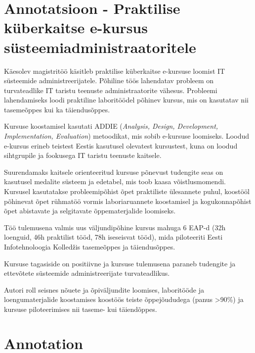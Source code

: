 \clearpage
\chapter*{Annotatsioon - Praktilise küberkaitse e-kursus
süsteemiadministraatoritele}
\label{annotatsioon}
\thispagestyle{empty}
Käesolev magistritöö käsitleb praktilise küberkaitse e-kursuse loomist IT süsteemide administreerijatele. Põhiline töös lahendatav probleem on turvateadlike IT taristu teenuste administraatorite vähesus. Probleemi lahendamiseks loodi praktiline laboritöödel põhinev kursus, mis on kasutatav nii tasemeõppes kui ka täiendusõppes.

Kursuse koostamisel kasutati \gls{ADDIE} (\emph{Analysis, Design, Development, Implementation, Evaluation}) metoodikat, mis sobib e-kursuse loomiseks. Loodud e-kursus erineb teistest Eestis kasutusel olevatest kursustest, kuna on loodud sihtgrupile ja fookusega IT taristu teenuste kaitsele.

Suurendamaks kaitsele orienteeritud kursuse põnevust tudengite seas on kasutusel medalite süsteem ja edetabel, mis toob kaasa võistlusmomendi. Kursusel kasutatakse probleemipõhist õpet praktiliste ülesannete puhul, koostööl põhinevat õpet rühmatöö vormis laboriaruannete  koostamisel ja kogukonnapõhist õpet abistavate ja selgitavate õppematerjalide loomiseks.

Töö tulemusena valmis uus väljundipõhine kursus mahuga 6 EAP-d (32h loenguid, 46h praktilist tööd, 78h iseseisvat tööd), mida piloteeriti Eesti Infotehnoloogia Kolledžis tasemeõppes ja täiendusõppes. %

Kursuse tagasiside on positiivne ja kursuse tulemusena paraneb tudengite ja ettevõtete süsteemide administreerijate turvateadlikus.

Autori roll seisnes nõuete ja õpiväljundite loomises, laboritööde ja loengumaterjalide koostamises koostöös teiste õppejõududega (panus >90\%) ja kursuse piloteerimises nii taseme- kui täiendõppes.

\clearpage
\chapter*{Annotation}
\label{annotation}
\thispagestyle{empty}

